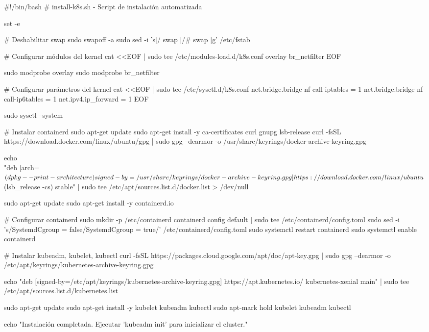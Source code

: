 \documentclass[11pt,a4paper]{article}
\begin{document}
\begin{commandbox}
\#!/bin/bash
\# install-k8s.sh - Script de instalación automatizada

set -e

\# Deshabilitar swap
sudo swapoff -a
sudo sed -i 's|/ swap |/# swap |g' /etc/fstab

\# Configurar módulos del kernel
cat <<EOF | sudo tee /etc/modules-load.d/k8s.conf
overlay
br\_netfilter
EOF

sudo modprobe overlay
sudo modprobe br\_netfilter

\# Configurar parámetros del kernel
cat <<EOF | sudo tee /etc/sysctl.d/k8s.conf
net.bridge.bridge-nf-call-iptables  = 1
net.bridge.bridge-nf-call-ip6tables = 1
net.ipv4.ip\_forward                 = 1
EOF

sudo sysctl --system

\# Instalar containerd
sudo apt-get update
sudo apt-get install -y ca-certificates curl gnupg lsb-release
curl -fsSL https://download.docker.com/linux/ubuntu/gpg | sudo gpg --dearmor -o /usr/share/keyrings/docker-archive-keyring.gpg

echo \\
  "deb [arch=$(dpkg --print-architecture) signed-by=/usr/share/keyrings/docker-archive-keyring.gpg] https://download.docker.com/linux/ubuntu \\
  $(lsb_release -cs) stable" | sudo tee /etc/apt/sources.list.d/docker.list > /dev/null

sudo apt-get update
sudo apt-get install -y containerd.io

\# Configurar containerd
sudo mkdir -p /etc/containerd
containerd config default | sudo tee /etc/containerd/config.toml
sudo sed -i 's/SystemdCgroup = false/SystemdCgroup = true/' /etc/containerd/config.toml
sudo systemctl restart containerd
sudo systemctl enable containerd

\# Instalar kubeadm, kubelet, kubectl
curl -fsSL https://packages.cloud.google.com/apt/doc/apt-key.gpg | sudo gpg --dearmor -o /etc/apt/keyrings/kubernetes-archive-keyring.gpg

echo "deb [signed-by=/etc/apt/keyrings/kubernetes-archive-keyring.gpg] https://apt.kubernetes.io/ kubernetes-xenial main" | sudo tee /etc/apt/sources.list.d/kubernetes.list

sudo apt-get update
sudo apt-get install -y kubelet kubeadm kubectl
sudo apt-mark hold kubelet kubeadm kubectl

echo "Instalación completada. Ejecutar 'kubeadm init' para inicializar el cluster."
\end{commandbox}
\end{document}
